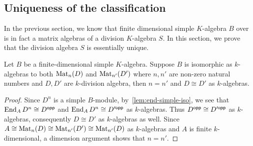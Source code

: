 \subsection{Uniqueness of the classification}\label{sec:wed-artin-unique}
In the previous section, we know that finite dimensional simple $K$-algebra $B$
over is in fact a matrix algebras of a division $K$-algebra $S$. In this
section, we prove that the division algebra $S$ is essentially unique.

\begin{theorem} Let $B$ be a
  finite-dimensional simple $K$-algebra. Suppose $B$ is isomorphic as
  $k$-algebras to both $\operatorname{Mat}_{n}(D)$ and $\operatorname{Mat}_{n'}(D')$ where $n, n'$ are
  non-zero natural numbers and $D, D'$ are $k$-division algebra, then $n = n'$
  and $D \cong D'$ as $k$-algebras.\label{thm:wed-artin-unique} \leanok
\end{theorem}

\begin{proof}
  Since $D^{n}$ is a simple $B$-module, by~\cref{lem:end-simple-iso}, we see
  that $\operatorname{End}_{A}D^{n}\cong D^{\mathsf{opp}}$ and $\operatorname{End}_{A}D^{n}\cong D'^{\mathsf{opp}}$ as
  $k$-algebras. Thus $D^{\mathsf{opp}}\cong D'^{\mathsf{opp}}$ as $k$-algebras, consequently
  $D\cong D'$ as $k$-algebras as well. Since
  $A \cong \operatorname{Mat}_{n}(D)\cong \operatorname{Mat}_{n'}(D')\cong \operatorname{Mat}_{n'}(D)$ as $k$-algebras and
  $A$ is finite $k$-dimensional, a dimension argument shows that $n=n'$.
\end{proof}


